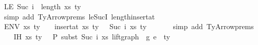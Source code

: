 \begin{isabellebody}
\ LE{\isacharcolon}{\kern0pt}\ {\isachardoublequoteopen}Suc\ i\ {\isasymle}\ length\ {\isacharparenleft}{\kern0pt}{\isacharparenleft}{\kern0pt}xs{\isacharprime}{\kern0pt}{\isacharcomma}{\kern0pt}\ ty{}{\isacharprime}{\kern0pt}{\isacharparenright}{\kern0pt}\ {\isacharhash}{\kern0pt}\ {\isasymGamma}{}{\isacharparenright}{\kern0pt}{\isachardoublequoteclose}\isanewline
\ \ \ \ \ \isamarkupfalse%
\ {\isacharparenleft}{\kern0pt}simp\ add{\isacharcolon}{\kern0pt}\ TyArrow{\isachardot}{\kern0pt}prems{\isacharparenleft}{\kern0pt}{}{\isacharcomma}{\kern0pt}{}{\isacharparenright}{\kern0pt}\ le{\isacharunderscore}{\kern0pt}SucI\ length{\isacharunderscore}{\kern0pt}insert{\isacharunderscore}{\kern0pt}at{\isacharparenright}{\kern0pt}\isanewline
\ \ \isamarkupfalse%
\ ENV{\isacharcolon}{\kern0pt}\ {\isachardoublequoteopen}{\isacharparenleft}{\kern0pt}xs{\isacharprime}{\kern0pt}{\isacharcomma}{\kern0pt}\ ty{}{\isacharprime}{\kern0pt}{\isacharparenright}{\kern0pt}\ {\isacharhash}{\kern0pt}\ {\isasymGamma}{\isacharprime}{\kern0pt}\ {\isacharequal}{\kern0pt}\ insert{\isacharunderscore}{\kern0pt}at\ {\isacharparenleft}{\kern0pt}{\isacharparenleft}{\kern0pt}xs{\isacharprime}{\kern0pt}{\isacharcomma}{\kern0pt}\ ty{}{\isacharprime}{\kern0pt}{\isacharparenright}{\kern0pt}\ {\isacharhash}{\kern0pt}\ {\isasymGamma}{}{\isacharparenright}{\kern0pt}\ {\isacharparenleft}{\kern0pt}Suc\ i{\isacharparenright}{\kern0pt}\ {\isacharparenleft}{\kern0pt}xs{\isacharcomma}{\kern0pt}\ ty{}{\isacharparenright}{\kern0pt}{\isachardoublequoteclose}\isanewline
\ \ \ \ \ \isamarkupfalse%
\ {\isacharparenleft}{\kern0pt}simp\ add{\isacharcolon}{\kern0pt}\ TyArrow{\isachardot}{\kern0pt}prems{\isacharparenleft}{\kern0pt}{}{\isacharparenright}{\kern0pt}{\isacharparenright}{\kern0pt}\isanewline
\isanewline
\ \ \isamarkupfalse%
\ IH{\isacharcolon}{\kern0pt}\ {\isachardoublequoteopen}{\isacharparenleft}{\kern0pt}xs{\isacharprime}{\kern0pt}{\isacharcomma}{\kern0pt}\ ty{}{\isacharprime}{\kern0pt}{\isacharparenright}{\kern0pt}\ {\isacharhash}{\kern0pt}\ {\isasymGamma}{}\ {\isasymturnstile}{\isacharbraceleft}{\kern0pt}P{\isacharbraceright}{\kern0pt}\ {\isacharparenleft}{\kern0pt}subst\ {\isacharparenleft}{\kern0pt}Suc\ i{\isacharparenright}{\kern0pt}\ xs\ {\isacharparenleft}{\kern0pt}lift{\isacharunderscore}{\kern0pt}graph\ {}\ g{}{\isacharparenright}{\kern0pt}{\isacharparenright}{\kern0pt}\ e{\isacharprime}{\kern0pt}\ {\isacharcolon}{\kern0pt}\ ty{}{\isacharprime}{\kern0pt}{\isachardoublequoteclose}\isanewline

\end{isabellebody}
